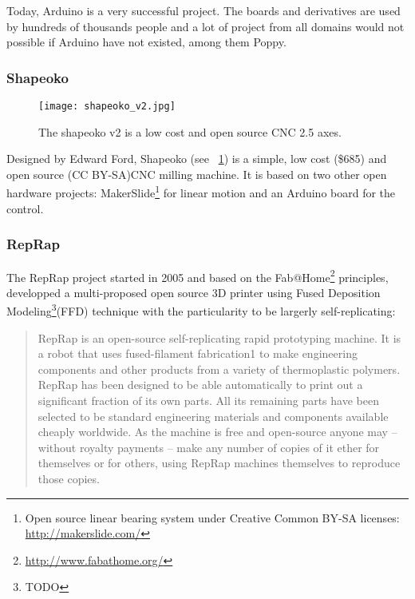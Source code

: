 Today, Arduino is a very successful project. The boards and derivatives are used by hundreds of thousands people and a lot of project from all domains would not possible if Arduino have not existed, among them Poppy.

\subsubsection{Shapeoko}

\begin{figure}[!h]
    \begin{center}
        \texttt{[image: shapeoko\_v2.jpg]}
    \end{center}
    \caption{The shapeoko v2 is a low cost and open source CNC 2.5 axes.}
    \label{fig:shapeoko}
\end{figure}

Designed by Edward Ford, Shapeoko (see \figurename~\ref{fig:shapeoko}) is a simple, low cost (\$685) and open source (CC BY-SA)CNC milling machine. It is based on two other open hardware projects: MakerSlide\footnote{Open source linear bearing system under Creative Common BY-SA licenses: \url{http://makerslide.com/}} for linear motion and an Arduino board for the control.



\subsubsection{RepRap} %

The RepRap project started in 2005 and based on the Fab@Home\footnote{\url{http://www.fabathome.org/}} principles, developped a multi-proposed open source 3D printer using Fused Deposition Modeling\footnote{TODO}(FFD) technique with the particularity to be largerly self-replicating:

\begin{quotation}
    RepRap is an open-source self-replicating rapid prototyping machine. It is a robot that uses fused-filament fabrication1 to make engineering components and other products from a variety of thermoplastic polymers. RepRap has been designed to be able automatically to print out a significant fraction of its own parts. All its remaining parts have been selected to be standard engineering materials and components available cheaply worldwide. As the machine is free and open-source anyone may – without royalty payments – make any number of copies of it ether for themselves or for others, using RepRap machines themselves to reproduce those copies.

\end{quotation}


